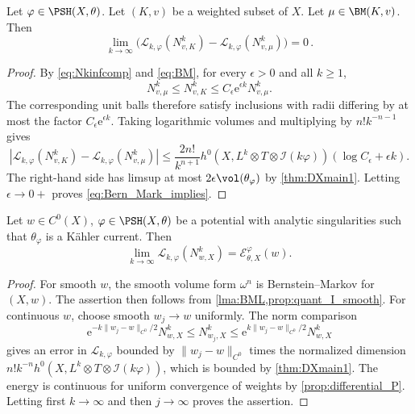 \begin{lemma}\label{lma:BML}
Let $\varphi\in \PSH(X,\theta)$.
Let $(K,v)$ be a weighted subset of $X$. Let $\mu\in \BM(K,v)$. Then
\begin{equation}\label{eq:Bern_Mark_implies}
\lim_{k\to\infty} \big( \mathcal{L}_{k,\varphi}(N^k_{v,K}) - \mathcal{L}_{k,\varphi}(N^k_{v,\mu})\big) = 0\,.
\end{equation}
\end{lemma}
\begin{proof}
By \eqref{eq:Nkinfcomp} and \eqref{eq:BM}, for every $\epsilon>0$ and all $k\geq 1$,
\[
N^k_{v,\mu}\leq N^k_{v,K}\leq C_\epsilon \mathrm{e}^{\epsilon k}N^k_{v,\mu}.
\]
The corresponding unit balls therefore satisfy inclusions with radii differing by at most the factor $C_\epsilon \mathrm{e}^{\epsilon k}$. Taking logarithmic volumes and multiplying by $n!k^{-n-1}$ gives
\[
\left|\mathcal{L}_{k,\varphi}(N^k_{v,K})-\mathcal{L}_{k,\varphi}(N^k_{v,\mu})\right|
\leq \frac{2n!}{k^{n+1}} h^0\left(X,L^k\otimes T\otimes \mathcal{I}(k\varphi)\right)(\log C_\epsilon+\epsilon k).
\]
The right-hand side has limsup at most $2\epsilon\vol(\theta_\varphi)$ by \cref{thm:DXmain1}. Letting $\epsilon\to 0+$ proves \eqref{eq:Bern_Mark_implies}.
\end{proof}



\begin{corollary}\label{cor:Ninfdifflim}
Let $w \in C^0(X)$, $\varphi \in \PSH(X,\theta)$ be a potential with analytic singularities such that $\theta_\varphi$ is a Kähler current. Then
\[
\lim_{k\to\infty}\mathcal{L}_{k,\varphi}(N^k_{w,X})=\mathcal{E}_{\theta,X}^{\varphi}(w).
\]
\end{corollary}
\begin{proof}
For smooth $w$, the smooth volume form $\omega^n$ is Bernstein--Markov for $(X,w)$. The assertion then follows from \cref{lma:BML,prop:quant_I_smooth}. For continuous $w$, choose smooth $w_j\to w$ uniformly. The norm comparison
\[
    \mathrm{e}^{-k\|w_j-w\|_{C^0}/2} N^k_{w,X}
    \leq N^k_{w_j,X}
    \leq \mathrm{e}^{k\|w_j-w\|_{C^0}/2} N^k_{w,X}
\]
gives an error in $\mathcal{L}_{k,\varphi}$ bounded by $\|w_j-w\|_{C^0}$ times the normalized dimension $n!k^{-n}h^0(X,L^k\otimes T\otimes\mathcal{I}(k\varphi))$, which is bounded by \cref{thm:DXmain1}. The energy is continuous for uniform convergence of weights by \cref{prop:differential_P}. Letting first $k\to\infty$ and then $j\to\infty$ proves the assertion.
\end{proof}


